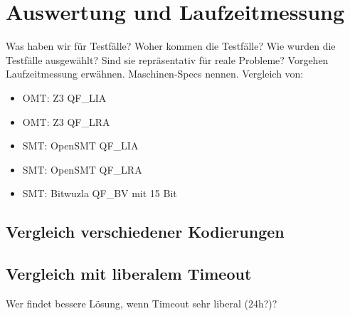 \chapter{Auswertung und Laufzeitmessung}
\label{chapter:auswertung}

Was haben wir für Testfälle?
Woher kommen die Testfälle?
Wie wurden die Testfälle ausgewählt?
Sind sie repräsentativ für reale Probleme?
Vorgehen Laufzeitmessung erwähnen.
Maschinen-Specs nennen.
Vergleich von:
\begin{itemize}
    \item OMT: Z3 QF\_LIA
    \item OMT: Z3 QF\_LRA
    \item SMT: OpenSMT QF\_LIA
    \item SMT: OpenSMT QF\_LRA
    \item SMT: Bitwuzla QF\_BV mit 15 Bit
\end{itemize}

\section{Vergleich verschiedener Kodierungen}

\section{Vergleich mit liberalem Timeout}
Wer findet bessere Lösung, wenn Timeout sehr liberal (24h?)?

